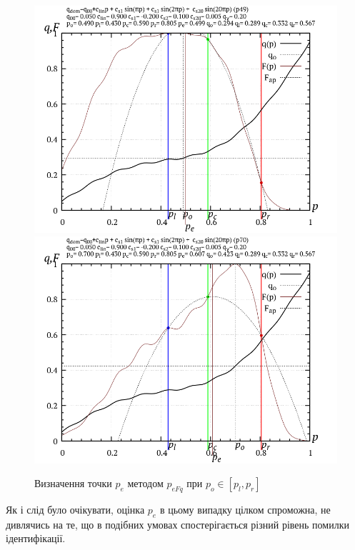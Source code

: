 \documentclass[a4paper,13pt]{atuaref}
\newlength\TW
\begin{document}
\begin{figure}[htb!]
  \centerline{
    \includegraphics[width=49\TW]{p3/p/p_eFq/q_p_eFq_p49.png}
    \hfill
    \includegraphics[width=49\TW]{p3/p/p_eFq/q_p_eFq_p70.png}
  }
  \caption{Визначення точки $ p_e $ методом $ p_{eFq} $ при $p_o \in [p_l, p_r] $}
  \label{atu:f:p_eFq_intra}
\end{figure}

Як і слід було очікувати, оцінка $ p_e $ в цьому випадку цілком спроможна, не
дивлячись на те, що в подібних умовах спостерігається різний рівень помилки
ідентифікації.
\end{document}
